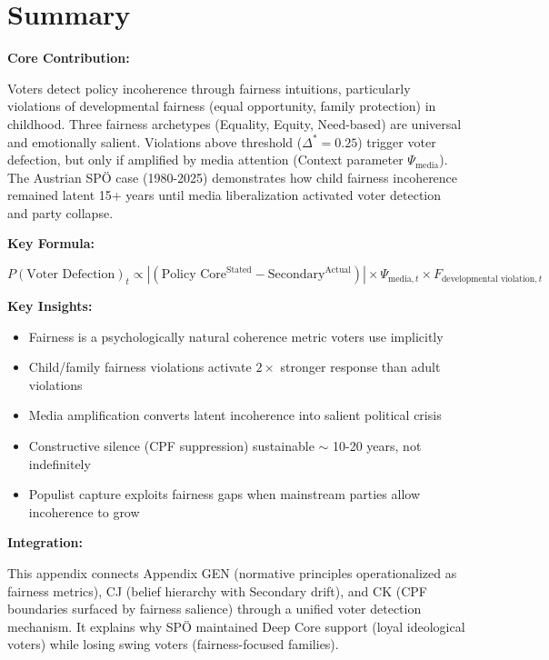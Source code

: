 \section{Summary}
\label{sec:cm-summary}

\begin{tcolorbox}[colback=green!10!white, colframe=green!75!black,
    title=\textbf{Appendix UNMAPPED_CM: Summary}]

\textbf{Core Contribution:}

Voters detect policy incoherence through fairness intuitions, particularly violations of
developmental fairness (equal opportunity, family protection) in childhood. Three fairness
archetypes (Equality, Equity, Need-based) are universal and emotionally salient. Violations
above threshold ($\Delta^* = 0.25$) trigger voter defection, but only if amplified by media
attention (Context parameter $\Psi_{\text{media}}$). The Austrian SPÖ case (1980-2025)
demonstrates how child fairness incoherence remained latent 15+ years until media liberalization
activated voter detection and party collapse.

\textbf{Key Formula:}

\begin{equation}
P(\text{Voter Defection})_t \propto |(\text{Policy Core}^{\text{Stated}} - \text{Secondary}^{\text{Actual}})| \times \Psi_{\text{media},t} \times F_{\text{developmental violation},t}
\end{equation}

\textbf{Key Insights:}

\begin{itemize}[nosep]
\item Fairness is a psychologically natural coherence metric voters use implicitly
\item Child/family fairness violations activate $2\times$ stronger response than adult violations
\item Media amplification converts latent incoherence into salient political crisis
\item Constructive silence (CPF suppression) sustainable $\sim$ 10-20 years, not indefinitely
\item Populist capture exploits fairness gaps when mainstream parties allow incoherence to grow
\end{itemize}

\textbf{Integration:}

This appendix connects Appendix GEN (normative principles operationalized as fairness metrics),
CJ (belief hierarchy with Secondary drift), and CK (CPF boundaries surfaced by fairness salience)
through a unified voter detection mechanism. It explains why SPÖ maintained Deep Core support
(loyal ideological voters) while losing swing voters (fairness-focused families).


\end{tcolorbox}
